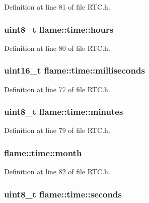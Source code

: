 Definition at line 81 of file R\-T\-C.\-h.

\hypertarget{structflame_1_1time_a1319436ec4fe46d74a865ee7717b998d}{
\subsubsection[{hours}]{\setlength{\rightskip}{0pt plus 5cm}uint8\-\_\-t flame\-::time\-::hours}}\label{structflame_1_1time_a1319436ec4fe46d74a865ee7717b998d}


Definition at line 80 of file R\-T\-C.\-h.

\hypertarget{structflame_1_1time_a899f1caf24d147cdd0cdeb787e289497}{
\subsubsection[{milliseconds}]{\setlength{\rightskip}{0pt plus 5cm}uint16\-\_\-t flame\-::time\-::milliseconds}}\label{structflame_1_1time_a899f1caf24d147cdd0cdeb787e289497}


Definition at line 77 of file R\-T\-C.\-h.

\hypertarget{structflame_1_1time_afda149b0149ecab591b605e108eb80ae}{
\subsubsection[{minutes}]{\setlength{\rightskip}{0pt plus 5cm}uint8\-\_\-t flame\-::time\-::minutes}}\label{structflame_1_1time_afda149b0149ecab591b605e108eb80ae}


Definition at line 79 of file R\-T\-C.\-h.

\hypertarget{structflame_1_1time_a78a0e559562f4e7102e083da6384a1c6}{
\subsubsection[{month}]{ flame\-::time\-::month}}\label{structflame_1_1time_a78a0e559562f4e7102e083da6384a1c6}


Definition at line 82 of file R\-T\-C.\-h.

\hypertarget{structflame_1_1time_af9b2c35926951e50470223c2d05a1ca4}{
\subsubsection[{seconds}]{\setlength{\rightskip}{0pt plus 5cm}uint8\-\_\-t flame\-::time\-::seconds}}\label{structflame_1_1time_af9b2c35926951e50470223c2d05a1ca4}


